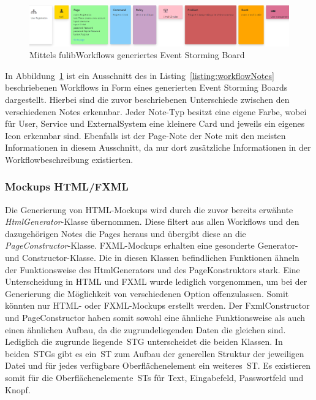 \begin{figure}[h]
    \centering
    \includegraphics[width=1.0\textwidth]{images/3.1/board}
    \caption{Mittels fulibWorkflows generiertes Event Storming Board}
    \label{fig:generated-board}
\end{figure}

In Abbildung~\ref{fig:generated-board} ist ein Ausschnitt des in Listing~\ref{listing:workflowNotes} beschriebenen Workflows in
Form eines generierten Event Storming Boards dargestellt.
Hierbei sind die zuvor beschriebenen Unterschiede zwischen den verschiedenen Notes erkennbar.
Jeder Note-Typ besitzt eine eigene Farbe, wobei für User, Service und ExternalSystem eine kleinere Card und jeweils ein
eigenes Icon erkennbar sind.
Ebenfalls ist der Page-Note der Note mit den meisten Informationen in diesem Ausschnitt, da nur dort zusätzliche Informationen
in der Workflowbeschreibung existierten.

\subsubsection{Mockups HTML/FXML}
Die Generierung von HTML-Mockups wird durch die zuvor bereits erwähnte \textit{HtmlGenerator}-Klasse übernommen.
Diese filtert aus allen Workflows und den dazugehörigen Notes die Pages heraus und übergibt diese an die \textit{PageConstructor}-Klasse.
FXML-Mockups erhalten eine gesonderte Generator- und Constructor-Klasse.
Die in diesen Klassen befindlichen Funktionen ähneln der Funktionsweise des HtmlGenerators und des PageKonstruktors stark.
Eine Unterscheidung in HTML und FXML wurde lediglich vorgenommen, um bei der Generierung die Möglichkeit von verschiedenen Option offenzulassen.
Somit könnten nur HTML- oder FXML-Mockups erstellt werden.
Der FxmlConstructor und PageConstructor haben somit sowohl eine ähnliche Funktionsweise als auch einen ähnlichen Aufbau, da die zugrundeliegenden Daten die gleichen sind.
Lediglich die zugrunde liegende~\ac{STG} unterscheidet die beiden Klassen.
In beiden~\ac{STG}s gibt es ein~\ac{ST} zum Aufbau der generellen Struktur der jeweiligen Datei und für jedes verfügbare Oberflächenelement ein weiteres~\ac{ST}.
Es existieren somit für die Oberflächenelemente~\ac{ST}s für Text, Eingabefeld, Passwortfeld und Knopf.

